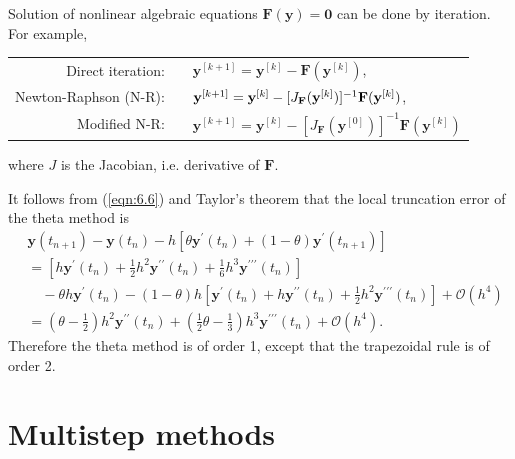 \documentclass[a4paper]{article}
\begin{document}
Solution of nonlinear algebraic equations $\mathbf{F}(\mathbf{y})= \mathbf{0}$ can be done by iteration. For example,
\begin{center}
    \begin{tabular}{rl}
        Direct iteration:& $\quad \mathbf{y}^{[k+1]}=\mathbf{y}^{[k]}-\mathbf{F}(\mathbf{y}^{[k]})$,\\[0.5em]
Newton-Raphson (N-R):& $\quad \mathbf{y}^{[k+1]}=\mathbf{y}^{[k]}-[J_{\bf F}(\mathbf{y}^{[k]})]^{-1} \mathbf{F}(\mathbf{y}^{[k]})$,\\[0.5em]
Modified N-R:& $\quad \mathbf{y}^{[k+1]}=\mathbf{y}^{[k]}-[J_{\mathbf{F}}(\mathbf{y}^{[0]})]^{-1} \mathbf{F}(\mathbf{y}^{[k]})$
    \end{tabular}
\end{center}
where $J$ is the Jacobian, i.e. derivative of $\mathbf{F}$.

\begin{remark}
    It follows from (\ref{eqn:6.6}) and Taylor's theorem that the local truncation error of the theta method is
\[
\begin{aligned}
& \mathbf{y}\left(t_{n+1}\right)-\mathbf{y}\left(t_n\right)-h\left[\theta \mathbf{y}^{\prime}\left(t_n\right)+(1-\theta) \mathbf{y}^{\prime}\left(t_{n+1}\right)\right] \\
&= {\left[h \mathbf{y}^{\prime}\left(t_n\right)+\frac{1}{2} h^2 \mathbf{y}^{\prime \prime}\left(t_n\right)+\frac{1}{6} h^3 \mathbf{y}^{\prime \prime \prime}\left(t_n\right)\right] } \\
& \quad-\theta h \mathbf{y}^{\prime}\left(t_n\right)-(1-\theta) h\left[\mathbf{y}^{\prime}\left(t_n\right)+h \mathbf{y}^{\prime \prime}\left(t_n\right)+\frac{1}{2} h^2 \mathbf{y}^{\prime \prime \prime}\left(t_n\right)\right]+\mathcal{O}\left(h^4\right) \\
&=\left(\theta-\frac{1}{2}\right) h^2 \mathbf{y}^{\prime \prime}\left(t_n\right)+\left(\frac{1}{2} \theta-\frac{1}{3}\right) h^3 \mathbf{y}^{\prime \prime \prime}\left(t_n\right)+\mathcal{O}\left(h^4\right) .
\end{aligned}
\]
Therefore the theta method is of order 1, except that the trapezoidal rule is of order 2.
\end{remark}

\section{Multistep methods}
\end{document}
